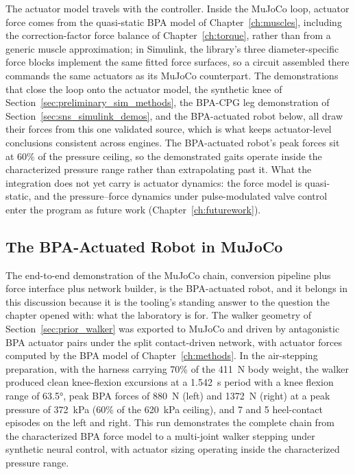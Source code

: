 The actuator model travels with the controller. Inside the MuJoCo loop, actuator force comes from the quasi-static BPA model of Chapter~\ref{ch:muscles}, including the correction-factor force balance of Chapter~\ref{ch:torque}, rather than from a generic muscle approximation; in Simulink, the library's three diameter-specific force blocks implement the same fitted force surfaces, so a circuit assembled there commands the same actuators as its MuJoCo counterpart. The demonstrations that close the loop onto the actuator model, the synthetic knee of Section~\ref{sec:preliminary_sim_methods}, the BPA-CPG leg demonstration of Section~\ref{sec:sns_simulink_demos}, and the BPA-actuated robot below, all draw their forces from this one validated source, which is what keeps actuator-level conclusions consistent across engines. The BPA-actuated robot's peak forces sit at 60\% of the pressure ceiling, so the demonstrated gaits operate inside the characterized pressure range rather than extrapolating past it. What the integration does not yet carry is actuator dynamics: the force model is quasi-static, and the pressure--force dynamics under pulse-modulated valve control \citep{elzein_pressure_2025} enter the program as future work (Chapter~\ref{ch:futurework}).

\subsection{The BPA-Actuated Robot in MuJoCo}\label{sec:bpa_walker}

The end-to-end demonstration of the MuJoCo chain, conversion pipeline plus force interface plus network builder, is the BPA-actuated robot, and it belongs in this discussion because it is the tooling's standing answer to the question the chapter opened with: what the laboratory is for. The walker geometry of Section~\ref{sec:prior_walker} was exported to MuJoCo and driven by antagonistic BPA actuator pairs under the split contact-driven network, with actuator forces computed by the BPA model of Chapter~\ref{ch:methods}. In the air-stepping preparation, with the harness carrying 70\% of the \qty{411}{\N} body weight, the walker produced clean knee-flexion excursions at a \qty{1.542}{\second} period with a knee flexion range of \ang{63.5}, peak BPA forces of \qty{880}{\N} (left) and \qty{1372}{\N} (right) at a peak pressure of \qty{372}{\kPa} (60\% of the \qty{620}{\kPa} ceiling), and 7 and 5 heel-contact episodes on the left and right. This run demonstrates the complete chain from the characterized BPA force model to a multi-joint walker stepping under synthetic neural control, with actuator sizing operating inside the characterized pressure range.

